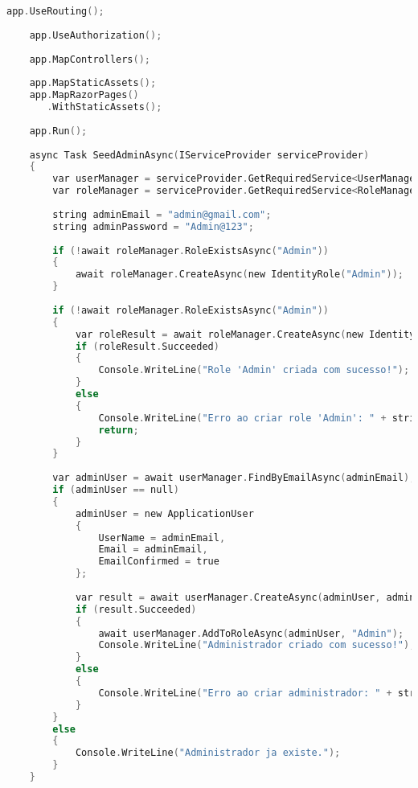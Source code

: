 \documentclass[12pt]{article}
\begin{document}
\begin{lstlisting}[language=C,caption={Program.cs}]
    app.UseRouting();
    
    app.UseAuthorization();
    
    app.MapControllers();
    
    app.MapStaticAssets();
    app.MapRazorPages()
       .WithStaticAssets();
    
    app.Run();
    
    async Task SeedAdminAsync(IServiceProvider serviceProvider)
    {
        var userManager = serviceProvider.GetRequiredService<UserManager<ApplicationUser>>();
        var roleManager = serviceProvider.GetRequiredService<RoleManager<IdentityRole>>();
    
        string adminEmail = "admin@gmail.com";
        string adminPassword = "Admin@123";
    
        if (!await roleManager.RoleExistsAsync("Admin"))
        {
            await roleManager.CreateAsync(new IdentityRole("Admin"));
        }
    
        if (!await roleManager.RoleExistsAsync("Admin"))
        {
            var roleResult = await roleManager.CreateAsync(new IdentityRole("Admin"));
            if (roleResult.Succeeded)
            {
                Console.WriteLine("Role 'Admin' criada com sucesso!");
            }
            else
            {
                Console.WriteLine("Erro ao criar role 'Admin': " + string.Join(", ", roleResult.Errors));
                return;
            }
        }
    
        var adminUser = await userManager.FindByEmailAsync(adminEmail);
        if (adminUser == null)
        {
            adminUser = new ApplicationUser
            {
                UserName = adminEmail,
                Email = adminEmail,
                EmailConfirmed = true
            };
    
            var result = await userManager.CreateAsync(adminUser, adminPassword);
            if (result.Succeeded)
            {
                await userManager.AddToRoleAsync(adminUser, "Admin");
                Console.WriteLine("Administrador criado com sucesso!");
            }
            else
            {
                Console.WriteLine("Erro ao criar administrador: " + string.Join(", ", result.Errors));
            }
        }
        else
        {
            Console.WriteLine("Administrador ja existe.");
        }
    }
    
\end{lstlisting}

\vspace{0.5cm}
\end{document}
